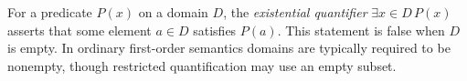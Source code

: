
For a predicate $P(x)$ on a domain $D$, the \emph{existential quantifier} $\exists x\in D\,P(x)$ asserts that some element $a\in D$ satisfies $P(a)$. This statement is false when $D$ is empty. In ordinary first-order semantics domains are typically required to be nonempty, though restricted quantification may use an empty subset.
